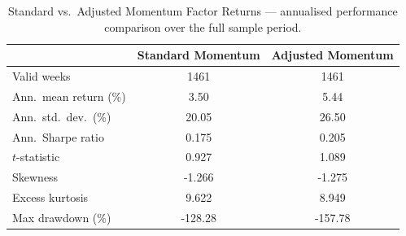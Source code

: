 \begin{table}[htbp]
\centering
\caption{Standard vs.\ Adjusted Momentum Factor Returns --- annualised performance comparison over the full sample period.}
\label{tab:performance}
\small
\begin{tabular}{l c c}
\toprule
    & Standard Momentum & Adjusted Momentum \\
\midrule
    Valid weeks & 1461 & 1461 \\
    Ann.\ mean return (\%) & 3.50 & 5.44 \\
    Ann.\ std.\ dev.\ (\%) & 20.05 & 26.50 \\
    Ann.\ Sharpe ratio & 0.175 & 0.205 \\
    $t$-statistic & 0.927 & 1.089 \\
    Skewness & -1.266 & -1.275 \\
    Excess kurtosis & 9.622 & 8.949 \\
    Max drawdown (\%) & -128.28 & -157.78 \\
\bottomrule
\end{tabular}
\end{table}
